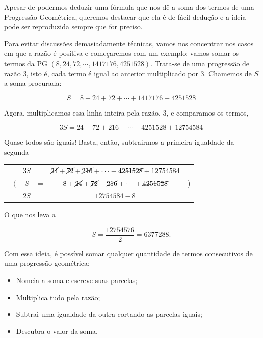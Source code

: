 Apesar de podermos deduzir uma fórmula que nos dê a soma dos termos de uma Progressão Geométrica, queremos destacar que ela é de fácil dedução e a ideia pode ser reproduzida sempre que for preciso.

Para evitar discussões demasiadamente técnicas, vamos nos concentrar nos casos em que a razão é positiva e começaremos com um exemplo: vamos somar os termos da PG $(8, 24, 72,\cdots, 1417176, 4251528)$. Trata-se de uma progressão de razão $3$, isto é, cada termo é igual ao anterior multiplicado por $3$. Chamemos de $S$ a soma procurada: 

\[
S=8+24+72+ \cdots +1417176+4251528
\]

Agora, multiplicamos essa linha inteira pela razão, $3$, e comparamos os termos,

\[
3S=24+72+216+ \cdots +4251528+12754584
\]

Quase todos são iguais! Basta, então, subtrairmos a primeira igualdade da segunda

\begin{table}[H]
    \centering
    \begin{tabular}{ccccc}
       \  & $3S$ & = & $\cancel{24}+\cancel{72}+\cancel{216}+\cdots+\cancel{4251528} + 12754584$ & \ \\
       $-($ & $S$  & = & $8+\cancel{24}+\cancel{72}+\cancel{216}+\cdots+\cancel{4251528}$  & ) \\
       \midrule
       \  & $2S$ & = & $ 12754584 - 8$ & \ \\
    \end{tabular}
\end{table}

O que nos leva a

\[
S=\dfrac{12754576}{2}=6377288.
\]

Com essa ideia, é possível somar qualquer quantidade de termos consecutivos de uma progressão geométrica:

\begin{itemize}

\item Nomeia a soma e escreve suas parcelas;

\item Multiplica tudo pela razão;

\item Subtrai uma igualdade da outra cortando as parcelas iguais;

\item Descubra o valor da soma.

\end{itemize}

